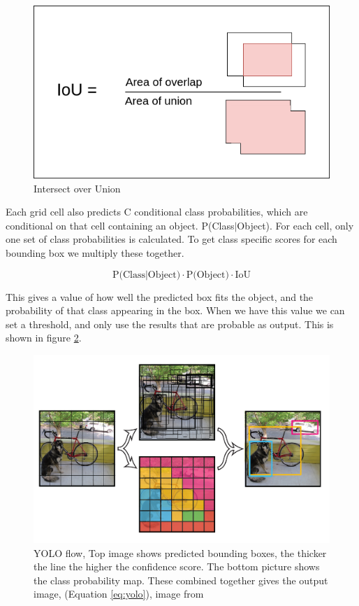 \begin{figure}[h!]
\centering
\includegraphics[scale=0.5]{fig/iou.png}
\caption{Intersect over Union}
\label{fig:IoU}
\end{figure}

Each grid cell also predicts C conditional class probabilities, which are conditional on that cell containing an object. P(Class$|$Object). For each cell, only one set of class probabilities is calculated. To get class specific scores for each bounding box we multiply these together. 

\begin{equation}
    \text{P(Class}|\text{Object)} \cdot \text{P(Object)} \cdot \text{IoU}
    \label{eq:yolo}
\end{equation}

This gives a value of how well the predicted box fits the object, and the probability of that class appearing in the box. When we have this value we can set a threshold, and only use the results that are probable as output. This is shown in figure \ref{fig:yolo_flow}.  

\begin{figure}[h!]
\centering
\includegraphics[scale=0.4]{images/YOLO_flow.png}
\caption{YOLO flow, Top image shows predicted bounding boxes, the thicker the line the higher the confidence score. The bottom picture shows the class probability map. These combined together gives the output image, (Equation \ref{eq:yolo}), image from \citep{YOLOv1}}
\label{fig:yolo_flow}
\end{figure}

